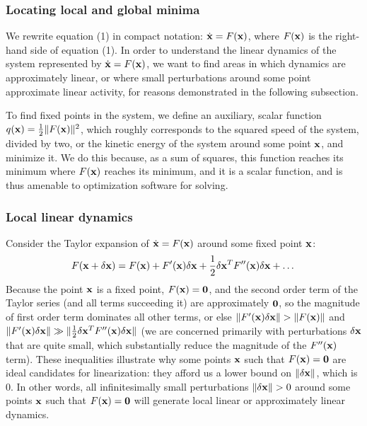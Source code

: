 \documentclass[12pt,a4paper,final]{iopart}
\begin{document}
\subsubsection{Locating local and global minima}
We rewrite equation (1) in compact notation: $\dot{\bf{x}} = F(\bf{x})$, where $F(\bf{x})$ is the right-hand side of equation (1). In order to understand the linear dynamics of the system represented by $\dot{\bf{x}} = F(\bf{x})$, we want to find areas in which dynamics are approximately linear, or where small perturbations around some point approximate linear activity, for reasons demonstrated in the following subsection.

To find fixed points in the system, we define an auxiliary, scalar function $q({\bf x}) = \frac{1}{2} \lVert F({\bf x}) \rVert^2$, which roughly corresponds to the squared speed of the system, divided by two, or the kinetic energy of the system around some point ${\bf x}$, and minimize it. We do this because, as a sum of squares, this function reaches its minimum where $F({\bf x})$ reaches its minimum, and it is a scalar function, and is thus amenable to optimization software for solving.

\subsubsection{Local linear dynamics}
Consider the Taylor expansion of $\dot{\bf{x}} = F(\bf{x})$ around some fixed point $\bf{x}$:
\[
    F({\bf x} + \delta {\bf x}) = F({\bf x}) + F'({\bf x})\delta {\bf x} + \frac{1}{2} \delta {\bf x}^T F''({\bf x}) \delta {\bf x} + \dots
\]
Because the point $\bf{x}$ is a fixed point, $F({\bf x}) = {\bf 0}$, and the second order term of the Taylor series (and all terms succeeding it) are approximately ${\bf 0}$, so the magnitude of first order term dominates all other terms, or else $\lVert F'({\bf x})\delta {\bf x} \rVert > \lVert F({\bf x}) \rVert$ and $\lVert F'({\bf x})\delta {\bf x} \rVert \gg \lVert \frac{1}{2} \delta {\bf x}^T F''({\bf x}) \delta {\bf x} \rVert$ (we are concerned primarily with perturbations $\delta {\bf x}$ that are quite small, which substantially reduce the magnitude of the $F''({\bf x})$ term). These inequalities illustrate why some points ${\bf x}$ such that $F({\bf x}) = {\bf 0}$ are ideal candidates for linearization: they afford us a lower bound on $\lVert \delta {\bf x} \rVert$, which is 0. In other words, all infinitesimally small perturbations $\lVert \delta {\bf x} \rVert > 0 $ around some points ${\bf x}$ such that $F({\bf x}) = {\bf 0}$ will generate local linear or approximately linear dynamics.
\end{document}
